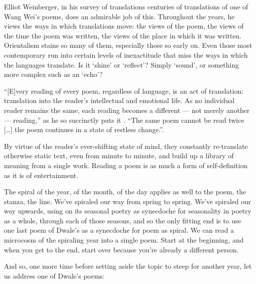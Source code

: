 \documentclass[12pt,oneside]{memoir}
\begin{document}
Elliot Weinberger, in his survey of translations centuries of translations of one of Wang Wei's poems, does an admirable job of this. Throughout the years, he views the ways in which translations move: the views of the poem, the views of the time the poem was written, the views of the place in which it was written. Orientalism stains so many of them, especially those so early on. Even those most contemporary run into certain levels of inexactitude that miss the ways in which the languages translate. Is it `shine' or `reflect'? Simply `sound', or something more complex such as an `echo'?

``[E]very reading of every poem, regardless of language, is an act of translation: translation into the reader's intellectual and emotional life. As no individual reader remains the same, each reading becomes a different --- not merely another --- reading,'' as he so succinctly puts it \parencite[46]{wangwei}. ``The same poem cannot be read twice [\ldots] the poem continues in a state of restless change.''. 

By virtue of the reader's ever-shifting state of mind, they constantly re-translate otherwise static text, even from minute to minute, and build up a library of meaning from a single work. Reading a poem is as much a form of self-definition as it is of entertainment.

The spiral of the year, of the month, of the day applies as well to the poem, the stanza, the line. We've spiraled our way from spring to spring. We've spiraled our way upwards, using on its seasonal poetry as synecdoche for seasonality in poetry as a whole, through each of those seasons, and so the only fitting end is to use one last poem of Dwale's as a synecdoche for poem as spiral. We can read a microcosm of the spiraling year into a single poem. Start at the beginning, and when you get to the end, start over because you're already a different person.

And so, one more time before setting aside the topic to steep for another year, let us address one of Dwale's poems:
\end{document}
